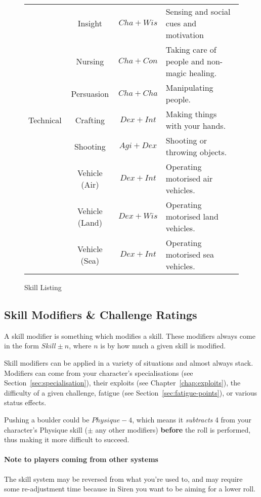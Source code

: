 \begin{figure}
\begin{tabular}{r | c | c | l}
              & Insight          & $Cha+Wis$ & Sensing and social cues and motivation        \\
              & Nursing          & $Cha+Con$ & Taking care of people and non-magic healing.  \\
              & Persuasion       & $Cha+Cha$ & Manipulating people.                          \\\hline
    Technical & Crafting         & $Dex+Int$ & Making things with your hands.                \\
              & Shooting         & $Agi+Dex$ & Shooting or throwing objects.                 \\
              & Vehicle (Air)    & $Dex+Int$ & Operating motorised air vehicles.             \\
              & Vehicle (Land)   & $Dex+Wis$ & Operating motorised land vehicles.            \\
              & Vehicle (Sea)    & $Dex+Int$ & Operating motorised sea vehicles.             \\
\end{tabular}
\caption{Skill Listing}
\label{fig:skills}
\end{figure}

\subsection{Skill Modifiers \& Challenge Ratings}
A skill modifier is something which modifies a skill.
These modifiers always come in the form $Skill \pm n$, where $n$ is by how much a given skill is modified.

Skill modifiers can be applied in a variety of situations and almost always stack.
Modifiers can come from your character's specialisations (see Section~\ref{sec:specialisation}), their exploits (see Chapter~\ref{chap:exploits}), the difficulty of a given challenge, fatigue (see Section~\ref{sec:fatigue-points}), or various status effects.

Pushing a boulder could be $\mathit{Physique} - 4$, which means it \textit{subtracts} 4 from your character's Physique skill ($\pm$ any other modifiers) \textbf{before} the roll is performed, thus making it more difficult to succeed.

\paragraph{Note to players coming from other systems} The skill system may be reversed from what you're used to, and may require some re-adjustment time because in Siren you want to be aiming for a lower roll.
\newpage
